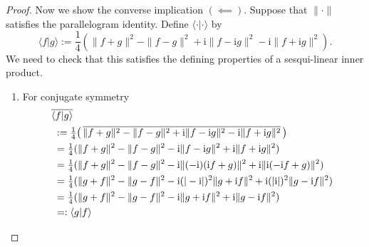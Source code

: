 \begin{proof}
Now we show the converse implication \((\impliedby)\).
Suppose that $\|\cdot\|$ satisfies the parallelogram identity. Define $\langle\cdot|\cdot\rangle$ by
\begin{equation*}
\langle f  |  g\rangle := \frac{1}{4} (\|f+g\|^2-\|f-g\|^2+\mathrm{i}\|f-\mathrm{i}g\|^2-\mathrm{i}\|f+\mathrm{i}g\|^2).
\end{equation*}
We need to check that this satisfies the defining properties of a sesqui-linear inner product.
\begin{enumerate}[label=(\roman*)]
\item For conjugate symmetry
\begin{align*}
&\hspace{-1mm}
\overline{\langle f  |  g\rangle} \\
& :=  \tfrac{1}{4} \bigl(\,\overline{\|f+g\|^2-\|f-g\|^2+\mathrm{i}\|f-\mathrm{i}g\|^2-\mathrm{i}\|f+\mathrm{i}g\|^2}\,\bigr)\\
& =  \tfrac{1}{4} (\|f+g\|^2-\|f-g\|^2-\mathrm{i}\|f-\mathrm{i}g\|^2+\mathrm{i}\|f+\mathrm{i}g\|^2)\\
& =  \tfrac{1}{4} (\|f+g\|^2-\|f-g\|^2-\mathrm{i}\|(-\mathrm{i})(\mathrm{i}f+g)\|^2+\mathrm{i}\|\mathrm{i}(-\mathrm{i}f+g)\|^2)\\
& =  \tfrac{1}{4} (\|g+f\|^2-\|g-f\|^2-\mathrm{i}(|-\mathrm{i}|)^2\|g+\mathrm{i}f\|^2+\mathrm{i}(|\mathrm{i}|)^2\|g-\mathrm{i}f\|^2)\\
& =  \tfrac{1}{4} (\|g+f\|^2-\|g-f\|^2-\mathrm{i}\|g+\mathrm{i}f\|^2+\mathrm{i}\|g-\mathrm{i}f\|^2)\\
& =: \langle g | f \rangle
\end{align*}


\end{enumerate}
\end{proof}
